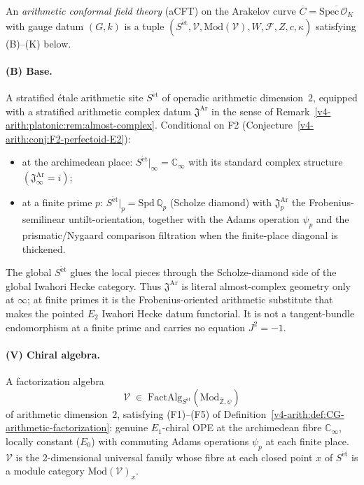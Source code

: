 \begin{definition}
\label{v4-arith:def:aCFT}
An \emph{arithmetic conformal field theory} (aCFT) on the Arakelov
curve \(\overline{C}=\overline{\mathrm{Spec}\,\mathcal{O}_{K}}\)
with gauge datum \((G,k)\) is a tuple
\((S^{\mathrm{\acute{e}t}},\mathcal{V},\mathrm{Mod}(\mathcal{V}),W,\mathcal{F},Z,c,\kappa)\)
satisfying (B)--(K) below.

\paragraph{(B) Base.} A stratified \'etale arithmetic site
\(S^{\mathrm{\acute{e}t}}\) of operadic arithmetic dimension~\(2\),
equipped with a stratified arithmetic complex datum
\(\mathfrak{J}^{\mathrm{Ar}}\) in the sense of
Remark~\ref{v4-arith:platonic:rem:almost-complex}. Conditional on F2
(Conjecture~\ref{v4-arith:conj:F2-perfectoid-E2}):
\begin{itemize}
\item at the archimedean place:
\(S^{\mathrm{\acute{e}t}}|_{\infty}=\mathbb{C}_{\infty}\) with its
standard complex structure
\((\mathfrak{J}^{\mathrm{Ar}}_{\infty}=i)\);
\item at a finite prime \(p\):
\(S^{\mathrm{\acute{e}t}}|_{p}=\mathrm{Spd}\,\mathbb{Q}_{p}\)
(Scholze diamond) with
\(\mathfrak{J}^{\mathrm{Ar}}_{p}\) the Frobenius-semilinear
untilt-orientation, together with the Adams operation
\(\psi_{p}\) and the prismatic/Nygaard comparison filtration when
the finite-place diagonal is thickened.
\end{itemize}
The global \(S^{\mathrm{\acute{e}t}}\) glues the local pieces
through the Scholze-diamond side of the global Iwahori Hecke
category. Thus \(\mathfrak{J}^{\mathrm{Ar}}\) is literal almost-complex
geometry only at \(\infty\); at finite primes it is the
Frobenius-oriented arithmetic substitute that makes the pointed
\(E_{2}\) Iwahori Hecke datum functorial. It is not a tangent-bundle
endomorphism at a finite prime and carries no equation \(J^{2}=-1\).

\paragraph{(V) Chiral algebra.} A factorization algebra
\begin{equation*}
\mathcal{V}\;\in\;\mathrm{FactAlg}_{S^{\mathrm{\acute{e}t}}}(\mathrm{Mod}_{\widehat{\mathbb{Z}},\psi})
\end{equation*}
of arithmetic dimension~\(2\), satisfying (F1)--(F5) of
Definition~\ref{v4-arith:def:CG-arithmetic-factorization}: genuine
\(E_{1}\)-chiral OPE at the archimedean fibre \(\mathbb{C}_{\infty}\),
locally constant (\(E_{0}\)) with commuting Adams operations
\(\psi_{p}\) at each finite place. \(\mathcal{V}\) is the 2-dimensional
universal family whose fibre at each closed point \(x\) of
\(S^{\mathrm{\acute{e}t}}\) is a module category \(\mathrm{Mod}(\mathcal{V})_{x}\).


\end{definition}
